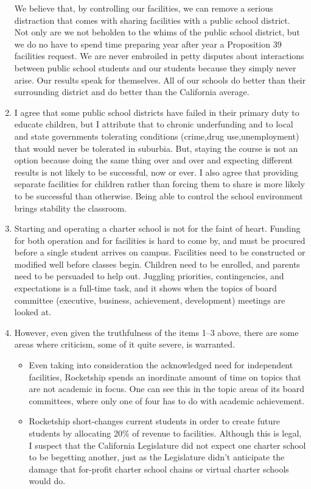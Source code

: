 \begin{enumerate}[topsep=0.3\baselineskip,itemsep=0.25\baselineskip]
  We believe that, by controlling our facilities, we can remove a serious distraction that comes with sharing facilities with a public school district. Not only are we not beholden to the whims of the public school district, but we do no have to spend time preparing year after year a Proposition 39 facilities request. We are never embroiled in petty disputes about interactions between public school students and our students because they simply never arise. Our results speak for themselves. All of our schools do better than their surrounding district and do better than the California average.
  \item I agree that some public school districts have failed in their primary duty to educate children, but I attribute that to chronic underfunding and to local and state governments tolerating conditions (crime,drug use,unemployment) that would never be tolerated in suburbia. But, staying the course is not an option because doing the same thing over and over and expecting different results is not likely to be successful, now or ever.
  I also agree that providing separate facilities for children rather than forcing them to share is more likely to be successful than otherwise. Being able to control the school environment brings stability the classroom.
  \item Starting and operating a charter school is not for the faint of heart. Funding for both operation and for facilities is hard to come by, and must be procured before a single student arrives on campus. Facilities need to be constructed or modified well before classes begin. Children need to be enrolled, and parents need to be persuaded to help out. Juggling priorities, contingencies, and expectations is a full-time task, and it shows when the topics of board committee (executive, business, achievement, development) meetings are looked at.
    \item However, even given the truthfulness of the items 1–3 above, there are some areas where criticism, some of it quite severe, is warranted.
    \begin{itemize}[topsep=0.125\baselineskip,itemsep=0.25\baselineskip]
      \item Even taking into consideration the acknowledged need for independent facilities, Rocketship spends an inordinate amount of time on topics that are not academic in focus. One can see this in the topic areas of its board committees, where only one of four has to do with academic achievement.
      \item Rocketship short-changes current students in order to create future students by allocating 20\% of revenue to facilities. Although this is legal, I suspect that the California Legislature did not expect one charter school to be begetting another, just as the Legislature didn't anticipate the damage that for-profit charter school chains or virtual charter schools would do.

\end{itemize}
\end{enumerate}
